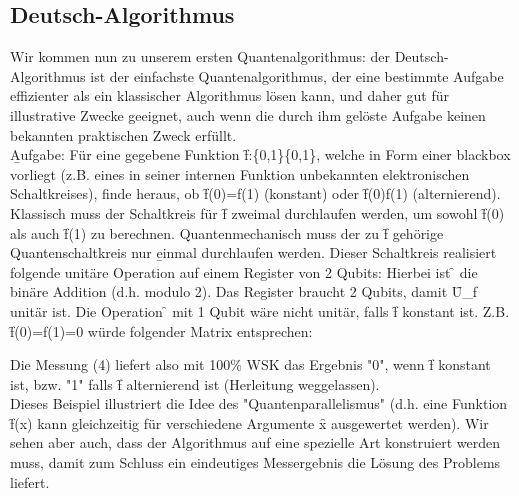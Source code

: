 \subsection{Deutsch-Algorithmus}
Wir kommen nun zu unserem ersten Quantenalgorithmus: der Deutsch-Algorithmus ist der einfachste Quantenalgorithmus, der eine bestimmte Aufgabe effizienter als ein klassischer Algorithmus lösen kann, und daher gut für illustrative Zwecke geeignet, auch wenn die durch ihm gelöste Aufgabe keinen bekannten praktischen Zweck erfüllt.\\[0.5em]
\b{Aufgabe:} Für eine gegebene Funktion \f{f:\left\{0,1\right\}\rightarrow\left\{0,1\right\}}, welche in Form einer blackbox vorliegt (z.B. eines in seiner internen Funktion unbekannten elektronischen Schaltkreises), finde heraus, ob \f{f(0)=f(1)} (konstant) oder \f{f(0)\neq f(1)} (alternierend).\\
Klassisch muss der Schaltkreis für \f{f} zweimal durchlaufen werden, um sowohl \f{f(0)} als auch \f{f(1)} zu berechnen. Quantenmechanisch muss der zu \f{f} gehörige Quantenschaltkreis nur \b{einmal} durchlaufen werden. Dieser Schaltkreis realisiert folgende unitäre Operation auf einem Register von 2 Qubits:
Hierbei ist \f{\oplus} die binäre Addition (d.h. modulo 2). Das Register braucht 2 Qubits, damit \f{U_f} unitär ist. Die Operation \f{\rightarrow{}} mit 1 Qubit wäre nicht unitär, falls \f{f} konstant ist. Z.B. \f{f(0)=f(1)=0} würde folgender Matrix entsprechen:

Die Messung (4) liefert also mit 100\% WSK das Ergebnis "0", wenn \f{f} konstant ist, bzw. "1" falls \f{f} alternierend ist (Herleitung weggelassen). \\
Dieses Beispiel illustriert die Idee des "Quantenparallelismus" (d.h. eine Funktion \f{f(x)} kann gleichzeitig für verschiedene Argumente \f{x} ausgewertet werden). Wir sehen aber auch, dass der Algorithmus auf eine spezielle Art konstruiert werden muss, damit zum Schluss ein eindeutiges Messergebnis die Lösung des Problems liefert.









